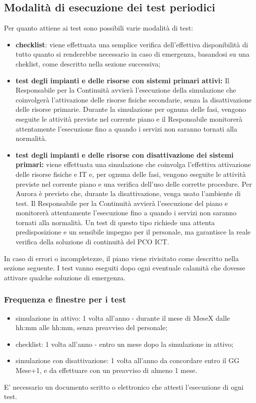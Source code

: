 \subsection{Modalità di esecuzione dei test periodici}
Per quanto attiene ai test sono possibili varie modalità di test: 
\begin{itemize}
\item \textbf{checklist}: viene effettuata una semplice verifica dell’effettiva disponibilità di tutto quanto si renderebbe necessario in caso di emergenza, basandosi su una cheklist, come descritto nella sezione successiva;
\item \textbf{test  degli  impianti  e  delle  risorse con sistemi primari attivi: } Il Responsabile per la Continuità avvierà l'esecuzione della simulazione che coinvolgerà l'attivazione  delle  risorse  fisiche secondarie, senza la disattivazione delle risorse primarie. Durante la simulazione per ognuna delle fasi, vengono eseguite le attività previste nel corrente piano e il Responsabile monitorerà attentamente l'esecuzione fino a quando i servizi non saranno tornati alla normalità.
\item \textbf{test  degli  impianti  e  delle  risorse con disattivazione dei sistemi primari:}  viene effettuata una simulazione che coinvolga l’effettiva 
attivazione  delle  risorse  fisiche  e  IT e, per ognuna delle fasi, vengono eseguite le attività previste nel corrente piano e una verifica dell'uso delle corrette procedure. Per Aurora è previsto che, durante la disattivazione, venga usato l'ambiente di test. Il Responsabile per la Continuità avvierà l'esecuzione del piano e monitorerà attentamente l'esecuzione fino a quando i servizi non saranno tornati alla normalità. Un  test  di  questo  tipo  richiede  una  attenta  predisposizione  e  un  sensibile impegno  per  il  personale,  ma  garantisce  la  reale  verifica  della  soluzione  di  continuità  del  PCO  ICT. 
\end{itemize}
In caso di errori o incompletezze, il piano viene rivisitato come descritto nella sezione seguente.
I test vanno eseguiti dopo ogni eventuale calamità che dovesse attivare qualche soluzione di emergenza.
\subsubsection{Frequenza e finestre per i test}
\begin{itemize}
\item simulazione in attivo: 1 volta all'anno - durante il mese di MeseX dalle hh:mm alle hh:mm, senza preavviso del personale;
\item checklist: 1 volta all'anno - entro un mese dopo la simulazione in attivo;
\item simulazione con disattivazione: 1 volta all'anno da concordare entro il GG Mese+1, e da effettuare con un preavviso di almeno 1 mese.
\end{itemize}
E' necessario un documento scritto o elettronico che attesti l'esecuzione di ogni test.
